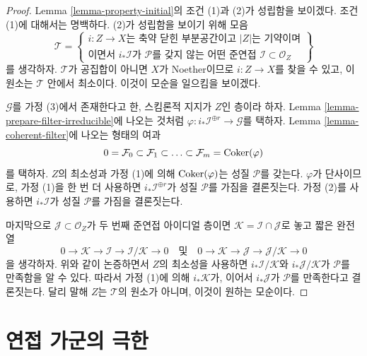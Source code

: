 \begin{proof}
Lemma \ref{lemma-property-initial}의 조건 (1)과 (2)가 성립함을 보이겠다.
조건 (1)에 대해서는 명백하다. (2)가 성립함을 보이기 위해 모음
$$
\mathcal{T} =
\left\{
\begin{matrix}
i : Z \to X \text{는 축약 닫힌 부분공간이고 }|Z|\text{는 기약이며}\\
\text{이면서 }i_*\mathcal{I}\text{가 }\mathcal{P}
\text{를 갖지 않는 어떤 준연접 }\mathcal{I} \subset \mathcal{O}_Z
\end{matrix}
\right\}
$$
를 생각하자. $\mathcal{T}$가 공집합이 아니면 $X$가 Noether이므로
$i : Z \to X$를 찾을 수 있고, 이 원소는 $\mathcal{T}$ 안에서 최소이다. 이것이
모순을 일으킴을 보이겠다.

\medskip\noindent
$\mathcal{G}$를 가정 (3)에서 존재한다고 한, 스킴론적 지지가 $Z$인
층이라 하자. Lemma \ref{lemma-prepare-filter-irreducible}에 나오는 것처럼
$\varphi : i_*\mathcal{I}^{\oplus r} \to \mathcal{G}$를 택하자.
Lemma \ref{lemma-coherent-filter}에 나오는 형태의 여과
$$
0 = \mathcal{F}_0 \subset \mathcal{F}_1 \subset
\ldots \subset \mathcal{F}_m = \mathop{\mathrm{Coker}}(\varphi)
$$
를 택하자. $Z$의 최소성과 가정 (1)에 의해
$\mathop{\mathrm{Coker}}(\varphi)$는 성질 $\mathcal{P}$를 갖는다. $\varphi$가
단사이므로, 가정 (1)을 한 번 더 사용하면
$i_*\mathcal{I}^{\oplus r}$가 성질 $\mathcal{P}$를 가짐을 결론짓는다.
가정 (2)를 사용하면 $i_*\mathcal{I}$가 성질 $\mathcal{P}$를 가짐을
결론짓는다.

\medskip\noindent
마지막으로 $\mathcal{J} \subset \mathcal{O}_Z$가 두 번째 준연접
아이디얼 층이면 $\mathcal{K} = \mathcal{I} \cap \mathcal{J}$로 놓고
짧은 완전열
$$
0 \to \mathcal{K} \to \mathcal{I} \to \mathcal{I}/\mathcal{K} \to 0
\quad
\text{및}
\quad
0 \to \mathcal{K} \to \mathcal{J} \to \mathcal{J}/\mathcal{K} \to 0
$$
을 생각하자. 위와 같이 논증하면서 $Z$의 최소성을 사용하면
$i_*\mathcal{I}/\mathcal{K}$와 $i_*\mathcal{J}/\mathcal{K}$가
$\mathcal{P}$를 만족함을 알 수 있다. 따라서 가정 (1)에 의해
$i_*\mathcal{K}$가, 이어서 $i_*\mathcal{J}$가 $\mathcal{P}$를
만족한다고 결론짓는다. 달리 말해 $Z$는 $\mathcal{T}$의 원소가 아니며,
이것이 원하는 모순이다.
\end{proof}






\section{연접 가군의 극한}
\label{section-limits}

